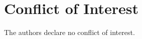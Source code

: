 \documentclass[3p,times,12pt]{elsarticle}
\begin{document}
\section*{Conflict of Interest}
The authors declare no conflict of interest.









\end{document}
